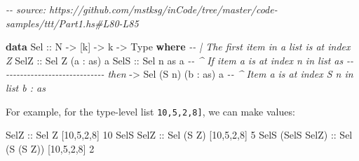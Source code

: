 \documentclass[]{article}
\newenvironment{Shaded}{}{}
\newcommand{\CommentTok}[1]{\textcolor[rgb]{0.38,0.63,0.69}{\textit{#1}}}
\newcommand{\DataTypeTok}[1]{\textcolor[rgb]{0.56,0.13,0.00}{#1}}
\newcommand{\DecValTok}[1]{\textcolor[rgb]{0.25,0.63,0.44}{#1}}
\newcommand{\KeywordTok}[1]{\textcolor[rgb]{0.00,0.44,0.13}{\textbf{#1}}}
\newcommand{\NormalTok}[1]{#1}
\newcommand{\OperatorTok}[1]{\textcolor[rgb]{0.40,0.40,0.40}{#1}}
\newcommand{\OtherTok}[1]{\textcolor[rgb]{0.00,0.44,0.13}{#1}}
\begin{document}
\begin{Shaded}
\begin{Highlighting}[]
\CommentTok{{-}{-} source: https://github.com/mstksg/inCode/tree/master/code{-}samples/ttt/Part1.hs\#L80{-}L85}

\KeywordTok{data} \DataTypeTok{Sel}\OtherTok{ ::} \DataTypeTok{N} \OtherTok{{-}>}\NormalTok{ [k] }\OtherTok{{-}>}\NormalTok{ k }\OtherTok{{-}>} \DataTypeTok{Type} \KeywordTok{where}
    \CommentTok{{-}{-} | The first item in a list is at index \textquotesingle{}\textquotesingle{}Z\textquotesingle{}}
    \DataTypeTok{SelZ}\OtherTok{ ::} \DataTypeTok{Sel} \DataTypeTok{\textquotesingle{}Z}\NormalTok{ (a \textquotesingle{}}\OperatorTok{:}\NormalTok{ as) a}
    \DataTypeTok{SelS}\OtherTok{ ::} \DataTypeTok{Sel}\NormalTok{     n        as  a  }\CommentTok{{-}{-} \^{} If item \textasciigrave{}a\textasciigrave{} is at index \textasciigrave{}n\textasciigrave{} in list \textasciigrave{}as\textasciigrave{}}
         \CommentTok{{-}{-} {-}{-}{-}{-}{-}{-}{-}{-}{-}{-}{-}{-}{-}{-}{-}{-}{-}{-}{-}{-}{-}{-}{-}{-}{-}{-}{-}{-} then}
         \OtherTok{{-}>} \DataTypeTok{Sel}\NormalTok{ (}\DataTypeTok{\textquotesingle{}S}\NormalTok{ n) (b \textquotesingle{}}\OperatorTok{:}\NormalTok{ as) a  }\CommentTok{{-}{-} \^{} Item \textasciigrave{}a\textasciigrave{} is at index \textasciigrave{}S n\textasciigrave{} in list \textasciigrave{}b : as\textasciigrave{}}
\end{Highlighting}
\end{Shaded}

For example, for the type-level list \texttt{\textquotesingle{}{[}10,5,2,8{]}},
we can make values:

\begin{Shaded}
\begin{Highlighting}[]
\DataTypeTok{SelZ}\OtherTok{             ::} \DataTypeTok{Sel}         \DataTypeTok{\textquotesingle{}Z}\NormalTok{   \textquotesingle{}[}\DecValTok{10}\NormalTok{,}\DecValTok{5}\NormalTok{,}\DecValTok{2}\NormalTok{,}\DecValTok{8}\NormalTok{] }\DecValTok{10}
\DataTypeTok{SelS} \DataTypeTok{SelZ}\OtherTok{        ::} \DataTypeTok{Sel}\NormalTok{     (}\DataTypeTok{\textquotesingle{}S} \DataTypeTok{\textquotesingle{}Z}\NormalTok{)  \textquotesingle{}[}\DecValTok{10}\NormalTok{,}\DecValTok{5}\NormalTok{,}\DecValTok{2}\NormalTok{,}\DecValTok{8}\NormalTok{] }\DecValTok{5}
\DataTypeTok{SelS}\NormalTok{ (}\DataTypeTok{SelS} \DataTypeTok{SelZ}\NormalTok{)}\OtherTok{ ::} \DataTypeTok{Sel}\NormalTok{ (}\DataTypeTok{\textquotesingle{}S}\NormalTok{ (}\DataTypeTok{\textquotesingle{}S} \DataTypeTok{\textquotesingle{}Z}\NormalTok{)) \textquotesingle{}[}\DecValTok{10}\NormalTok{,}\DecValTok{5}\NormalTok{,}\DecValTok{2}\NormalTok{,}\DecValTok{8}\NormalTok{] }\DecValTok{2}
\end{Highlighting}
\end{Shaded}
\end{document}

